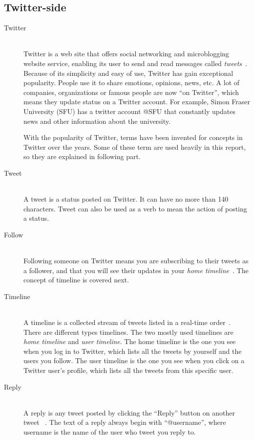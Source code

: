 \subsection{Twitter-side}

\begin{description} 
\item[Twitter] \hfill \\
Twitter is a web site that offers social networking and
  microblogging website service, enabling its user to send and read
  messages called \textit{tweets}~\cite{twitter_wiki}. Because of its
  simplicity and easy of use, Twitter has gain exceptional popularity.
  People use it to share emotions, opinions, news, etc.  A lot of
  companies, organizations or famous people are now ``on Twitter'',
  which means they update status on a Twitter account.  For example,
  Simon Fraser University (SFU) has a twitter account @SFU that
  constantly updates news and other information about the university.

  With the popularity of Twitter, terms have been invented for concepts
in Twitter over the years. Some of these term are used heavily in this
report, so they are explained in following part.

\item[Tweet] \hfill \\
 A tweet is a status posted on Twitter. It can
  have no more than 140 characters. Tweet can also be used as a verb
  to mean the action of posting a status.

\item[Follow] \hfill \\
 Following someone on Twitter means you are
  subscribing to their tweets as a follower, and that you will see
  their updates in your \textit{home timeline}~\cite{follow}. The
  concept of timeline is covered next.

\item[Timeline] \hfill \\
 A timeline is a collected stream of tweets
  listed in a real-time order~\cite{timeline}. There are different
  types timelines. The two mostly used timelines are \textit{home
    timeline} and \textit{user timeline}. The home timeline is the one
  you see when you log in to Twitter, which lists all the tweets by
  yourself and the users you follow. The user timeline is the one you
  see when you click on a Twitter user's profile, which lists all the
  tweets from this specific user.

\item[Reply] \hfill \\
A reply is any tweet posted by clicking the
 ``Reply'' button on another tweet ~\cite{mention_reply}. The text of a
  reply always begin with ``@username'', where username is the name of
  the user who tweet you reply to.


\end{description}
